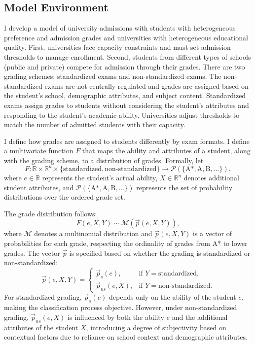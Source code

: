 \subsection{Model Environment}

I develop a model of university admissions with students with heterogeneous preference and admission grades and universities with heterogeneous educational quality. First, universities face capacity constraints and must set admission thresholds to manage enrollment. Second, students from different types of schools (public and private) compete for admission through their grades. There are two grading schemes: standardized exams and non-standardized exams. The non-standardized exams are not centrally regulated and grades are assigned based on the student's school, demographic attributes, and subject content. Standardized exams assign grades to students without considering the student's attributes and responding to the student's academic ability. Universities adjust thresholds to match the number of admitted students with their capacity. 

I define how grades are assigned to students differently by exam formats. I define a multivariate function \( F \) that maps the ability and attributes of a student, along with the grading scheme, to a distribution of grades. Formally, let
\[
F: \mathbb{R} \times \mathbb{R}^n \times \{ \text{standardized}, \text{non-standardized} \} \to \mathcal{P}(\{\text{A*}, \text{A}, \text{B}, \ldots\}),
\]
where \( e \in \mathbb{R} \) represents the student's actual ability, \( X \in \mathbb{R}^n \) denotes additional student attributes, and \( \mathcal{P}(\{\text{A*}, \text{A}, \text{B}, \ldots\}) \) represents the set of probability distributions over the ordered grade set.

The grade distribution follows:
\[
F(e, X, Y) \sim \mathcal{M}(\vec{p}(e, X, Y)),
\]
where \( \mathcal{M} \) denotes a multinomial distribution and \( \vec{p}(e, X, Y) \) is a vector of probabilities for each grade, respecting the ordinality of grades from A* to lower grades. The vector \( \vec{p} \) is specified based on whether the grading is standardized or non-standardized:
\[
\vec{p}(e, X, Y) =
\begin{cases}
\vec{p}_s(e), & \text{if } Y = \text{standardized}, \\
\vec{p}_{ns}(e, X), & \text{if } Y = \text{non-standardized}.
\end{cases}
\]
For standardized grading, \( \vec{p}_s(e) \) depends only on the ability of the student \( e \), making the classification process objective. However, under non-standardized grading, \( \vec{p}_{ns}(e, X) \) is influenced by both the ability \( e \) and the additional attributes of the student \( X \), introducing a degree of subjectivity based on contextual factors due to reliance on school context and demographic attributes.


